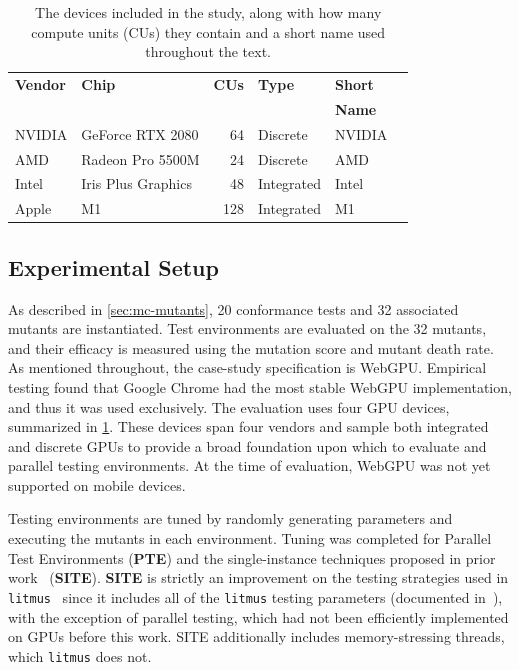 \begin{table}
\centering
\caption{The devices included in the study, along with how many compute units (CUs) they contain and a short name used throughout the text.}
\begingroup
{}
\begin{tabular}{l l r l l l}
 \toprule
 \textbf{Vendor} & \textbf{Chip} & \textbf{CUs} & \textbf{Type}  & \textbf{Short}\\
 & & & &\textbf{Name} \\
 \midrule
 NVIDIA & GeForce RTX 2080 & 64 & Discrete  & NVIDIA \\
 AMD & Radeon Pro 5500M & 24 & Discrete  & AMD\\
 Intel & Iris Plus Graphics & 48 & Integrated  & Intel\\
 Apple & M1 & 128 & Integrated  & M1\\
 \bottomrule
\end{tabular}
\endgroup
\label{table:mc-mutants-gpus}
\end{table}

\subsection{Experimental Setup \label{sec:mc-mutants-exp-setup}}
As described in \mysec\ref{sec:mc-mutants}, 20 conformance tests and 32 associated mutants are instantiated. Test environments are evaluated on the 32 mutants, and their efficacy is measured using the mutation score and mutant death rate.
As mentioned throughout, the case-study specification is WebGPU. Empirical testing found that Google Chrome had the most stable WebGPU implementation, and thus it was used exclusively.
%
The evaluation uses four GPU devices, summarized in \mytab\ref{table:mc-mutants-gpus}. These devices span four vendors and sample both integrated and discrete GPUs to provide a broad foundation upon which to evaluate \sys and parallel testing environments. At the time of evaluation, WebGPU was not yet supported on mobile devices.

Testing environments are tuned by randomly generating parameters and executing the mutants in each environment. Tuning was completed for Parallel Test Environments (\textbf{PTE}) and the single-instance techniques proposed in prior work~\cite{kirkham2020foundations} (\textbf{SITE}). \textbf{SITE} is strictly an improvement on the testing strategies used in \texttt{litmus}~\cite{alglave2011litmus} since it includes all of the \texttt{litmus} testing parameters (documented in~\cite[Sec.~3]{alglave2011litmus}), with the exception of parallel testing, which had not been efficiently implemented on GPUs before this work. SITE additionally includes memory-stressing threads, which \texttt{litmus} does not.

